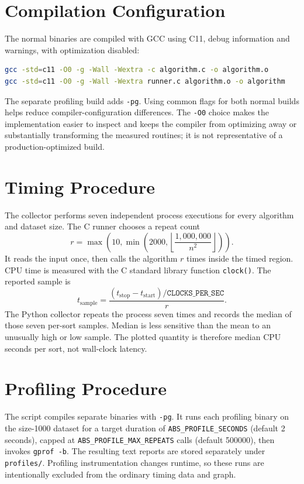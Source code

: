 \documentclass[12pt,a4paper,oneside]{report}
\begin{document}
\section{Compilation Configuration}
The normal binaries are compiled with GCC using C11, debug information and warnings, with optimization disabled:
\begin{lstlisting}[language=bash]
gcc -std=c11 -O0 -g -Wall -Wextra -c algorithm.c -o algorithm.o
gcc -std=c11 -O0 -g -Wall -Wextra runner.c algorithm.o -o algorithm
\end{lstlisting}
The separate profiling build adds \texttt{-pg}. Using common flags for both normal builds helps reduce compiler-configuration differences. The \texttt{-O0} choice makes the implementation easier to inspect and keeps the compiler from optimizing away or substantially transforming the measured routines; it is not representative of a production-optimized build.
\section{Timing Procedure}
The collector performs seven independent process executions for every algorithm and dataset size. The C runner chooses a repeat count
\[
r=\max\left(10,\min\left(2000,\left\lfloor\frac{1,000,000}{n^2}\right\rfloor\right)\right).
\]
It reads the input once, then calls the algorithm $r$ times inside the timed region. CPU time is measured with the C standard library function \texttt{clock()}. The reported sample is
\[
t_{\mathrm{sample}}=\frac{(t_{\mathrm{stop}}-t_{\mathrm{start}})/\texttt{CLOCKS\_PER\_SEC}}{r}.
\]
The Python collector repeats the process seven times and records the median of those seven per-sort samples. Median is less sensitive than the mean to an unusually high or low sample. The plotted quantity is therefore median CPU seconds per sort, not wall-clock latency.
\section{Profiling Procedure}
The script compiles separate binaries with \texttt{-pg}. It runs each profiling binary on the size-1000 dataset for a target duration of \texttt{ABS\_PROFILE\_SECONDS} (default 2 seconds), capped at \texttt{ABS\_PROFILE\_MAX\_REPEATS} calls (default 500000), then invokes \texttt{gprof -b}. The resulting text reports are stored separately under \texttt{profiles/}. Profiling instrumentation changes runtime, so these runs are intentionally excluded from the ordinary timing data and graph.
\end{document}
